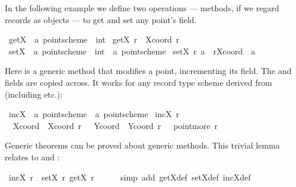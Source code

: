 \begin{isabellebody}
\begin{isamarkuptext}
  In the following example we define two operations --- methods, if we
  regard records as objects --- to get and set any point's  field.%
\end{isamarkuptext}%
\isamarkuptrue%
\isamarkupfalse%
\ getX\ {\isacharcolon}{\isacharcolon}\ {\isachardoublequoteopen}{\isacharprime}a\ point{\isacharunderscore}scheme\ {\isasymRightarrow}\ int{\isachardoublequoteclose}\ \isanewline
{\isachardoublequoteopen}getX\ r\ {\isasymequiv}\ Xcoord\ r{\isachardoublequoteclose}\isanewline
{}\isamarkupfalse%
\ setX\ {\isacharcolon}{\isacharcolon}\ {\isachardoublequoteopen}{\isacharprime}a\ point{\isacharunderscore}scheme\ {\isasymRightarrow}\ int\ {\isasymRightarrow}\ {\isacharprime}a\ point{\isacharunderscore}scheme{\isachardoublequoteclose}\ \isanewline
{\isachardoublequoteopen}setX\ r\ a\ {\isasymequiv}\ r{\isasymlparr}Xcoord\ {\isacharcolon}{\isacharequal}\ a{\isasymrparr}{\isachardoublequoteclose}%
\begin{isamarkuptext}%
Here is a generic method that modifies a point, incrementing its
   field.  The  and  fields
  are copied across.  It works for any record type scheme derived from
   (including  etc.):%
\end{isamarkuptext}%
\isamarkuptrue%
\isamarkupfalse%
\ incX\ {\isacharcolon}{\isacharcolon}\ {\isachardoublequoteopen}{\isacharprime}a\ point{\isacharunderscore}scheme\ {\isasymRightarrow}\ {\isacharprime}a\ point{\isacharunderscore}scheme{\isachardoublequoteclose}\ \isanewline
{\isachardoublequoteopen}incX\ r\ {\isasymequiv}\isanewline
\ \ {\isasymlparr}Xcoord\ {\isacharequal}\ Xcoord\ r\ {\isacharplus}\ {}{\isacharcomma}\ Ycoord\ {\isacharequal}\ Ycoord\ r{\isacharcomma}\ {\isasymdots}\ {\isacharequal}\ point{\isachardot}more\ r{\isasymrparr}{\isachardoublequoteclose}%
\begin{isamarkuptext}%
Generic theorems can be proved about generic methods.  This trivial
  lemma relates  to  and :%
\end{isamarkuptext}%
\isamarkuptrue%
\isamarkupfalse%
\ {\isachardoublequoteopen}incX\ r\ {\isacharequal}\ setX\ r\ {\isacharparenleft}getX\ r\ {\isacharplus}\ {}{\isacharparenright}{\isachardoublequoteclose}\isanewline
%
\isadelimproof
\ \ %
\endisadelimproof
%
\isatagproof
{}\isamarkupfalse%
\ {\isacharparenleft}simp\ add{\isacharcolon}\ getX{\isacharunderscore}def\ setX{\isacharunderscore}def\ incX{\isacharunderscore}def{\isacharparenright}%

\end{isabellebody}
